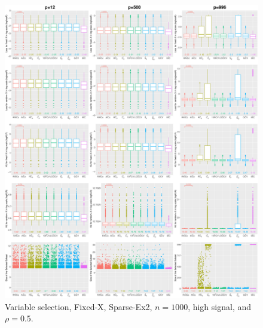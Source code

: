 \begin{figure}[!ht]
\centering
\includegraphics[width=\textwidth]{figures/supplement/fixedx/subset_selection/Sparse-Ex2_n1000_hsnr_rho05.eps}
\caption{Variable selection, Fixed-X, Sparse-Ex2, $n=1000$, high signal, and $\rho=0.5$.}
\end{figure}
\clearpage
